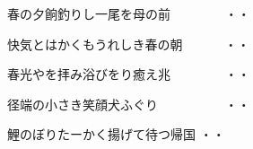 
\begin{shiika}春の夕餉釣りし一尾を母の前　　　　
\hfill{・・}\end{shiika}

\begin{shiika}快気とはかくもうれしき春の朝　　　
\hfill{・・}\end{shiika}

\begin{shiika}春光やを拝み浴びをり癒え兆　　　　
\hfill{・・}\end{shiika}

\begin{shiika}径端の小さき笑顔犬ふぐり　　　　　
\hfill{・・}\end{shiika}

\begin{shiika}鯉のぼりたーかく揚げて待つ帰国
\hfill{・・}\end{shiika}

